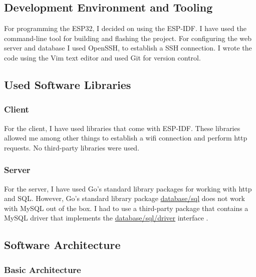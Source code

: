\subsection{Development Environment and Tooling}

For programming the ESP32, I decided on using the ESP-IDF.
I have used the  command-line tool for building and flashing the project.
For configuring the web server and database I used OpenSSH, to establish a SSH connection.
I wrote the code using the Vim text editor and used Git for version control.

\subsection{Used Software Libraries}

\subsubsection{Client}

For the client, I have used libraries that come with ESP-IDF.
These libraries allowed me among other things to establish a \gls{wifi} connection and perform \gls{http} requests.
No third-party libraries were used.

\subsubsection{Server}

For the server, I have used Go's standard library packages for working with \gls{http} and SQL.
However, Go's standard library package \href{https://pkg.go.dev/database/sql}{database/sql} does not work with MySQL out of the box.
I had to use a third-party package that contains a MySQL driver that implements the \href{https://pkg.go.dev/database/sql/driver}{database/sql/driver} interface \cite{go-mysql-driver}.

\subsection{Software Architecture}

\subsubsection{Basic Architecture}

